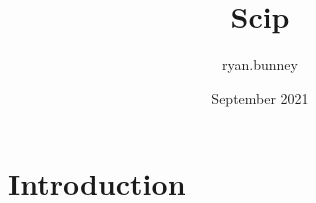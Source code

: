 \documentclass{article}
\title{Scip}
\author{ryan.bunney }
\date{September 2021}
\begin{document}
\maketitle

\section{Introduction}
\end{document}

